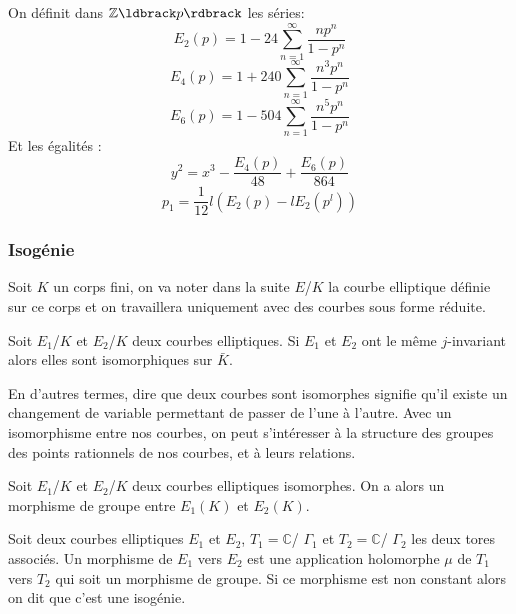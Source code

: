 \documentclass{article}
\begin{document}
\begin{prop}
On définit dans $\mathbb{Z}\ldbrack p \rdbrack$ les séries:
\begin{equation*}
E_2(p)= 1 -24\sum_{n=1}^{\infty}\frac{np^n}{1-p^n}
\end{equation*}
\begin{equation*}
E_4(p) = 1+240\sum_{n=1}^{\infty}\frac{n^3p^n}{1-p^n}
\end{equation*}
\begin{equation*}
E_6(p) = 1-504\sum_{n=1}^{\infty}\frac{n^5p^n}{1-p^n} 
\end{equation*}
Et les égalités : 
\begin{equation}
\label{EC-function of series}
y^2 = x^3 - \frac{E_4(p)}{48} + \frac{E_6(p)}{864}
\end{equation}
\begin{equation}
\label{p1}
p_1 = \frac{1}{12}l(E_2(p) -lE_2(p^l))
\end{equation}
\end{prop}

\subsubsection{Isogénie}
Soit $K$ un corps fini, on va noter dans la suite $E$/$K$ la courbe elliptique définie sur ce corps et on travaillera uniquement avec des courbes sous forme réduite.

\begin{defi}
Soit $E_1$/$K$ et $E_2$/$K$ deux courbes elliptiques. Si $E_1$ et $E_2$ ont le même $j$-invariant alors elles sont isomorphiques sur $\bar{K}$. 
\end{defi}
En d'autres termes, dire que deux courbes sont isomorphes signifie qu'il existe un changement de variable permettant de passer de l'une à l'autre. Avec un isomorphisme entre nos courbes, on peut s'intéresser à la structure des groupes des points rationnels de nos courbes, et à leurs relations.

\begin{prop}
Soit $E_1$/$K$ et $E_2$/$K$ deux courbes elliptiques isomorphes. On a alors un morphisme de groupe entre $E_1(K)$ et $E_2(K)$.
\end{prop}

\begin{defi}
Soit deux courbes elliptiques $E_1$ et $E_2$, $T_1=\mathbb{C}$/ $\Gamma_1$ et $T_2 = \mathbb{C}$/ $\Gamma_2$ les deux tores associés. Un morphisme de $E_1$ vers $E_2$ est une application holomorphe $\mu$ de $T_1$ vers $T_2$ qui soit un morphisme de groupe. Si ce morphisme est non constant alors on dit que c'est une isogénie.
\end{defi}
\end{document}
